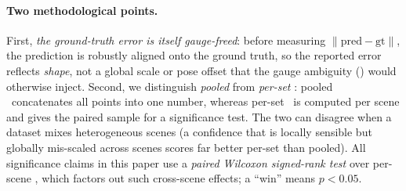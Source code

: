 \paragraph{Two methodological points.} First, \emph{the ground-truth error is
itself gauge-freed}: before measuring $\lVert \text{pred} - \text{gt}\rVert$, the prediction is
robustly aligned onto the ground truth, so the reported error reflects \emph{shape}, not a global
scale or pose offset that the gauge ambiguity () would otherwise inject.
Second, we distinguish \emph{pooled} from \emph{per-set} \ause: pooled \ause\ concatenates all points
into one number, whereas per-set \ause\ is computed per scene and gives the paired sample for a
significance test. The two can disagree when a dataset mixes heterogeneous scenes (a confidence that
is locally sensible but globally mis-scaled across scenes scores far better per-set than pooled). All
significance claims in this paper use a \emph{paired Wilcoxon signed-rank test} over per-scene \ause,
which factors out such cross-scene effects; a ``win'' means $p<0.05$.
